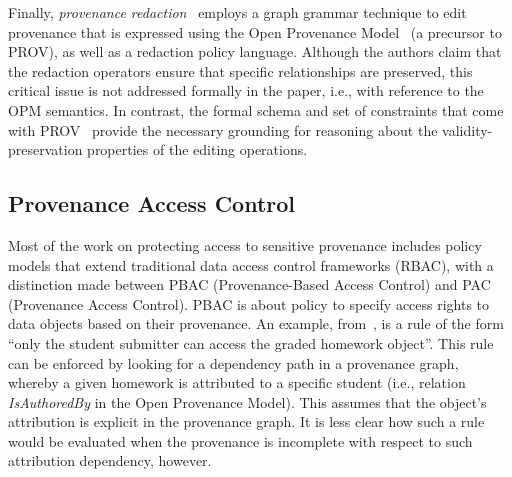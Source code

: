 Finally, \textit{provenance redaction}~\citep{Cadenhead:2011:TPU:1998441.1998456} employs a graph grammar technique to edit provenance that is expressed using the Open Provenance Model~\citep{Moreau2010a} (a precursor to PROV), as well as a redaction policy language.
%
Although the authors claim that the redaction operators ensure that specific relationships are preserved, this critical issue is not addressed formally in the paper, i.e., with reference to the OPM semantics.
%
In contrast, the formal schema and set of constraints that come with PROV~\citep{w3c-prov-dm,w3c-prov-constraints} provide the necessary grounding for reasoning about the validity-preservation properties of the editing operations.

\subsection{Provenance Access Control}

Most of the work on protecting access to sensitive provenance includes policy models that extend traditional data access control frameworks (RBAC), with a distinction made between PBAC (Provenance-Based Access Control) and PAC (Provenance Access Control).
%
PBAC is about policy to specify access rights to data objects based on their provenance.
%
An example, from~\citep{nguyen2012dependency}, is a rule of the form ``only the student submitter can access the graded homework object''. 
%
This rule can be enforced by looking for a dependency path in a provenance graph, whereby a given homework is attributed to a specific student (i.e., relation \textit{IsAuthoredBy} in the Open Provenance Model). This assumes that the object's attribution is explicit in the provenance graph. It is less clear how such a rule would be evaluated when the provenance is incomplete with respect to such attribution dependency, however.

